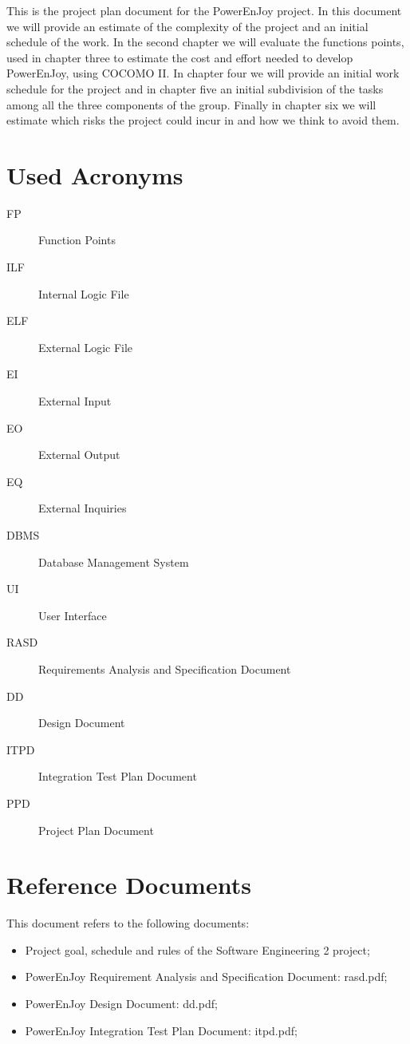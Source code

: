 This is the project plan document for the PowerEnJoy project. In this document we will provide an estimate of the complexity of the project and an initial schedule of the work. In the second chapter we will evaluate the functions points, used in chapter three to estimate the cost and effort needed to develop PowerEnJoy, using COCOMO II. In chapter four we will provide an initial work schedule for the project and in chapter five an initial subdivision of the tasks among all the three components of the group. Finally in chapter six we will estimate which risks the project could incur in and how we think to avoid them. 

\section{Used Acronyms}
\begin{description}
\item[FP] Function Points
\item[ILF] Internal Logic File
\item[ELF] External Logic File
\item[EI] External Input
\item[EO] External Output
\item[EQ] External Inquiries
\item[DBMS] Database Management System
\item[UI] User Interface
\item[RASD] Requirements Analysis and Specification Document
\item[DD] Design Document
\item[ITPD] Integration Test Plan Document
\item[PPD] Project Plan Document
\end{description}

\section{Reference Documents}
This document refers to the following documents:
\begin{itemize}
\item Project goal, schedule and rules of the Software Engineering 2 project;
\item PowerEnJoy Requirement Analysis and Specification Document: rasd.pdf;
\item PowerEnJoy Design Document: dd.pdf;
\item PowerEnJoy Integration Test Plan Document: itpd.pdf;
\end{itemize}